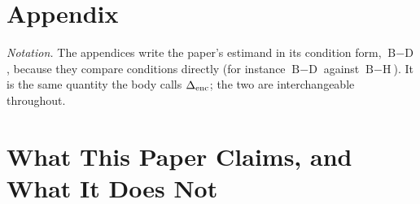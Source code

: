 \newpage
\appendix
\renewcommand{\thesection}{A\arabic{section}}

\section*{Appendix}

\noindent\emph{Notation.} The appendices write the paper's estimand in its
condition form, $\text{B}{-}\text{D}$, because they compare conditions directly
(for instance $\text{B}{-}\text{D}$ against $\text{B}{-}\text{H}$).  It is the
same quantity the body calls $\Delta_\text{enc}$; the two are interchangeable throughout.

\section{What This Paper Claims, and What It Does Not}
\label{app:claims}
%

